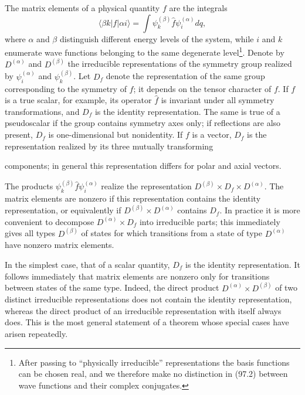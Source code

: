 The matrix elements of a physical quantity $f$ are the integrals
\begin{equation}
 \langle\beta k|f|\alpha i\rangle=\int\psi_k^{(\beta)}\widehat f\psi_i^{(\alpha)}dq,
 \tag{97.2}
\end{equation}
where $\alpha$ and $\beta$ distinguish different energy levels of the system, while $i$ and $k$ enumerate wave functions belonging to the same degenerate level\footnote{After passing to ``physically irreducible'' representations the basis functions can be chosen real, and we therefore make no distinction in (97.2) between wave functions and their complex conjugates.}. Denote by $D^{(\alpha)}$ and $D^{(\beta)}$ the irreducible representations of the symmetry group realized by $\psi_i^{(\alpha)}$ and $\psi_k^{(\beta)}$. Let $D_f$ denote the representation of the same group corresponding to the symmetry of $f$; it depends on the tensor character of $f$. If $f$ is a true scalar, for example, its operator $\widehat f$ is invariant under all symmetry transformations, and $D_f$ is the identity representation. The same is true of a pseudoscalar if the group contains symmetry axes only; if reflections are also present, $D_f$ is one-dimensional but nonidentity. If $f$ is a vector, $D_f$ is the representation realized by its three mutually transforming

components; in general this representation differs for polar and axial vectors.

The products $\psi_k^{(\beta)}\widehat f\psi_i^{(\alpha)}$ realize the representation $D^{(\beta)}\times D_f\times D^{(\alpha)}$. The matrix elements are nonzero if this representation contains the identity representation, or equivalently if $D^{(\beta)}\times D^{(\alpha)}$ contains $D_f$. In practice it is more convenient to decompose $D^{(\alpha)}\times D_f$ into irreducible parts; this immediately gives all types $D^{(\beta)}$ of states for which transitions from a state of type $D^{(\alpha)}$ have nonzero matrix elements.

In the simplest case, that of a scalar quantity, $D_f$ is the identity representation. It follows immediately that matrix elements are nonzero only for transitions between states of the same type. Indeed, the direct product $D^{(\alpha)}\times D^{(\beta)}$ of two distinct irreducible representations does not contain the identity representation, whereas the direct product of an irreducible representation with itself always does. This is the most general statement of a theorem whose special cases have arisen repeatedly.

